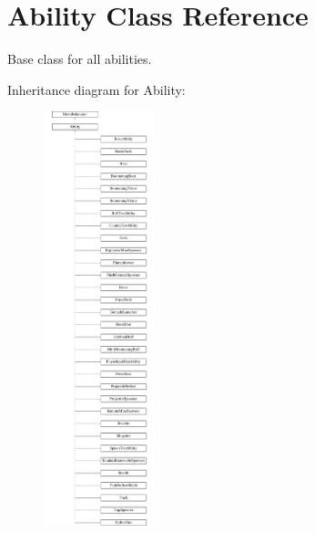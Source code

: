 \hypertarget{class_ability}{}\section{Ability Class Reference}
\label{class_ability}


Base class for all abilities.  


Inheritance diagram for Ability\+:\begin{figure}[H]
\begin{center}
\leavevmode
\includegraphics[height=12.000000cm]{class_ability}
\end{center}
\end{figure}
